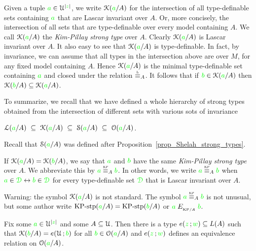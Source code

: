 \documentclass[creche.tex]{subfiles}
\begin{document}
Given a tuple ${\color{green} a}\in\EuScript U^{|{\color{green} z}|}$, we write \emph{$\EuScript K({\color{green} a}/A)$\/} for the intersection of all type-definable sets containing ${\color{green} a}$ that are Lascar invariant over $A$. Or, more concisely, the intersection of all sets that are type-definable over every model containing $A$. We call $\EuScript K({\color{green} a}/A)$ the \emph{Kim-Pillay strong type\/} over $A$. Clearly $\EuScript K({\color{green} a}/A)$ is Lascar invariant over $A$.  It also easy to see that $\EuScript K({\color{green} a}/A)$ is type-definable. In fact, by invariance, we can assume that all types in the intersection above are over $M$, for any fixed model containing $A$. Hence $\EuScript K({\color{green} a}/A)$ is the minimal type-definable set containing ${\color{green} a}$ and closed under the relation $\equivL_A$. It follows that if ${\color{green} b}\in\EuScript K({\color{green} a}/A)$ then $\EuScript K({\color{green} b}/A)\subseteq\EuScript K({\color{green} a}/A)$.

To summarize, we recall that we have defined a whole hierarchy of strong types obtained from the intersection of different sets with various sots of invariance

\hfil$\Ll({\gr a}/A)\ \subseteq\ \K({\gr a}/A)\ \subseteq\ \S({\gr a}/A)\ \subseteq\ \O({\gr a}/A)$. 

Recall that $\EuScript S({\color{green} a}/A)$ was defined after Proposition~\ref{prop_Shelah_strong_types}.



If $\EuScript K({\color{green} a}/A)=\EuScript K({\color{green} b}/A)$, we say that ${\color{green} a}$ and ${\color{green} b}$ have the same  \emph{Kim-Pillay strong type\/} over $A$. We abbreviate this by \emph{${\gr a}\stackrel{\smash{\scalebox{.5}{\rm KP}}}{\equiv}_A{\gr b}$}. In other words, we write ${\gr a}\equivKP_A{\gr b}$ when ${\color{green} a}\in{\color{green}\EuScript D}\leftrightarrow{\color{green}b}\in{\color{green}\EuScript D}$ for every type-definable set ${\color{green}\EuScript D}$ that is Lascar invariant over $A$.


\noindent\llap{\textcolor{red}{\Large\danger}\kern1.5ex}Warning: the symbol $\EuScript K({\color{green} a}/A)$ is not standard. The symbol ${\gr a}\equivKP_A{\gr b}$ is not unusual, but some author write ${\rm KP{\mbox{-}}stp}({\color{green} a}/A)={\rm KP{\mbox{-}}stp}({\color{green} b}/A)$ or ${\color{green} a}\mathrel{E_{_{{\rm KP}/A}}}{\color{green} b}$.

\begin{proposition}\label{prop_bardotto}
  Fix some ${\color{green} a}\in\EuScript U^{|{\color{green} z}|}$ and some $A\subseteq\EuScript U$. Then there is a type $e({\color{green} z}\,;{\color{green} w})\subseteq L(A)$ such that $\EuScript K({\color{green} b}/A)=e(\EuScript U\,;{\color{green} b})$ for all ${\color{green} b}\in\EuScript O({\color{green} a}/A)$ and $e({\color{green} z}\,;{\color{green} w})$ defines an equivalence relation on $\EuScript O({\color{green} a}/A)$.
\end{proposition}
\end{document}
